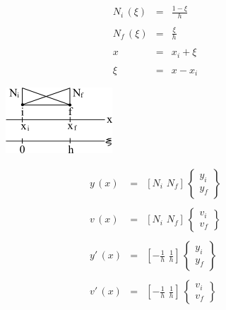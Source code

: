 \begin{example}
\begin{enumerate}
\begin{figure}[htb]
 \centering
 \begin{minipage}[c]{3cm}
  \[
   \begin{array}{rll}
    N_i\,(\xi) & = & \displaystyle \frac{1 - \xi}{h} \\
    \\
    N_f\,(\xi) & = & \displaystyle \frac{\xi}{h} \\
    \\
    x & = & x_i + \xi \\
    \\
    \xi & = & x - x_i
   \end{array}
  \]
 \end{minipage}\hspace*{2cm}
 \begin{minipage}[c]{5cm}
    \includegraphics[scale=1.0]{capitulos/capitulo7/figuras/algo_sol_sist_tri4.png}
    \label{fig:algo_sol_sist_tri4}
 \end{minipage}
\end{figure}

\[
 \begin{array}{rll}
  y\,(x) & = & [N_i \, \, N_f] \,
  \left\{
   \begin{array}{c}
    y_i \\
    y_f
   \end{array}
  \right\} \\
  \\
  v\,(x) & = & [N_i \, \, N_f] \,
  \left\{
   \begin{array}{c}
    v_i \\
    v_f
   \end{array}
  \right\} \\
  \\
  y'\,(x) & = & [\displaystyle -\frac{1}{h} \, \, \frac{1}{h}] \,
  \left\{
   \begin{array}{c}
    y_i \\
    y_f
   \end{array}
  \right\} \\
  \\
  v'\,(x) & = & [\displaystyle -\frac{1}{h} \, \, \frac{1}{h}] \,
  \left\{
   \begin{array}{c}
    v_i \\
    v_f
   \end{array}
  \right\}
 \end{array}
\]

\end{enumerate}

\end{example}


